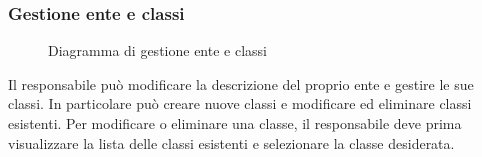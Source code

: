 \documentclass[a4paper, titlepage]{article}
\begin{document}
\subsubsection{Gestione ente e classi} 
\begin{figure}[H]
	\centering
	\noindent{}
	\caption{Diagramma di gestione ente e classi}
\end{figure}
Il responsabile può modificare la descrizione del proprio ente e gestire le sue classi. In particolare può creare nuove classi e modificare ed eliminare classi esistenti. Per modificare o eliminare una classe, il responsabile deve prima visualizzare la lista delle classi esistenti e selezionare la classe desiderata. 
\end{document}
